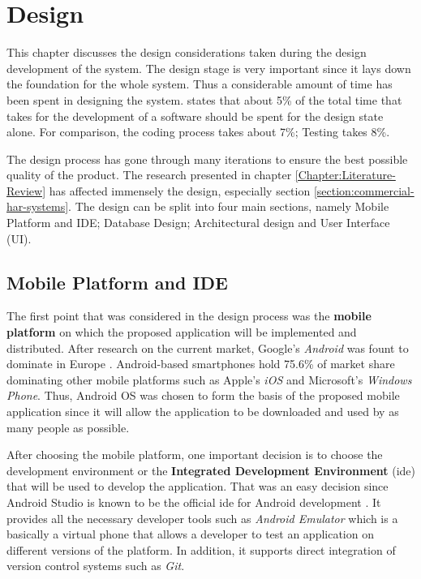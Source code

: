 \chapter{Design}
\label{Chapter:Design}

This chapter discusses the design considerations taken during the design development of the system. The design stage is very important since it lays down the foundation for the whole system.
Thus a considerable amount of time has been spent in designing the system. \citet[12]{bell2005} states that about 5\% of the total time that takes for the development of a software should be spent for the design state alone. For comparison, the coding process takes about 7\%; Testing takes 8\%. 

The design process has gone through many iterations to ensure the best possible quality of the product. The research presented in chapter \ref{Chapter:Literature-Review} has affected immensely the design, especially section \ref{section:commercial-har-systems}. The design can be split into four main sections, namely Mobile Platform and IDE; Database Design; Architectural design and User Interface (UI).

    

    \section{Mobile Platform and IDE}
    The first point that was considered in the design process was the \textbf{mobile platform} on which the proposed application will be implemented and distributed. After research on the current market, Google's \textit{Android} was fount to dominate in Europe \citep{williams2016}. Android-based smartphones hold 75.6\% of market share dominating other mobile platforms such as Apple's \textit{iOS} and Microsoft's \textit{Windows Phone}. Thus, Android OS was chosen to form the basis of the proposed mobile application since it will allow the application to be downloaded and used by as many people as possible.
        
    After choosing the mobile platform, one important decision is to choose the development environment or the \textbf{Integrated Development Environment} (\gls{ide}) that will be used to develop the application. That was an easy decision since Android Studio is known to be the official \gls{ide} for Android development \citep{androidstudio2017}. It provides all the necessary developer tools such as \textit{Android Emulator} which is a basically a virtual phone that allows a developer to test an application on different versions of the platform. In addition, it supports direct integration of version control systems such as \textit{Git}.
    
